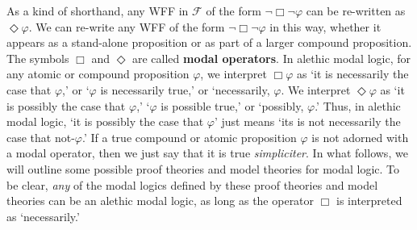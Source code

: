 \documentclass[11pt]{article}
\theoremstyle{definition}
\theoremstyle{remark}
\begin{document}
As a kind of shorthand, any WFF in $\mathcal{F}$ of the form $\neg\Box\neg\varphi$ can be re-written as $\Diamond \varphi$. We can re-write any WFF of the form $\neg\Box\neg\varphi$ in this way, whether it appears as a stand-alone proposition or as part of a larger compound proposition. The symbols $\Box$ and $\Diamond$ are called \textbf{modal operators}. In alethic modal logic, for any atomic or compound proposition $\varphi$, we interpret $\Box\varphi$ as `it is necessarily the case that $\varphi$,' or `$\varphi$ is necessarily true,' or `necessarily, $\varphi$. We interpret $\Diamond\varphi$ as `it is possibly the case that $\varphi$,' `$\varphi$ is possible true,' or `possibly, $\varphi$.' Thus, in alethic modal logic, `it is possibly the case that $\varphi$' just means `its is not necessarily the case that not-$\varphi$.' If a true compound or atomic proposition $\varphi$ is not adorned with a modal operator, then we just say that it is true \textit{simpliciter}. In what follows, we will outline some possible proof theories and model theories for modal logic. To be clear, \textit{any} of the modal logics defined by these proof theories and model theories can be an alethic modal logic, as long as the operator $\Box$ is interpreted as `necessarily.'\par 
\end{document}
